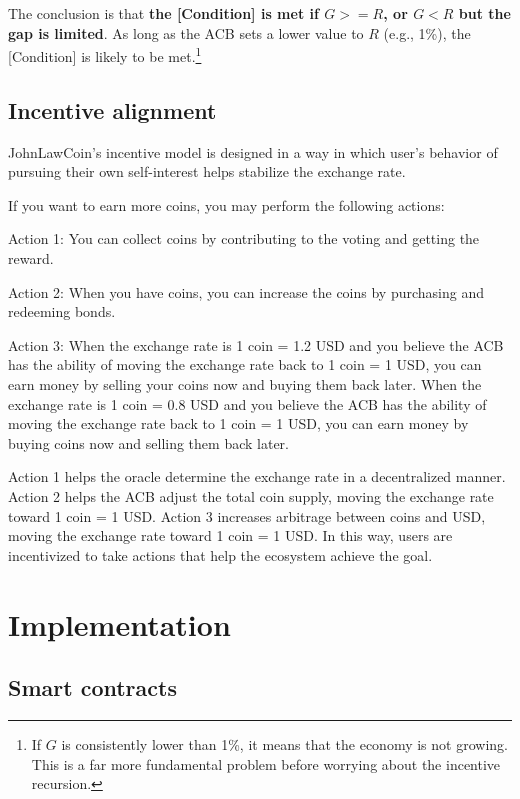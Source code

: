 \documentclass[dvipdfmx,a4paper]{article}
\begin{document}
The conclusion is that \textbf{the [Condition] is met if $G>=R$, or $G<R$ but the gap is limited}. As long as the ACB sets a lower value to $R$ (e.g., 1\%), the [Condition] is likely to be met.\footnote{If $G$ is consistently lower than 1\%, it means that the economy is not growing. This is a far more fundamental problem before worrying about the incentive recursion.}

\subsection{Incentive alignment}

JohnLawCoin's incentive model is designed in a way in which user's behavior of pursuing their own self-interest helps stabilize the exchange rate.

If you want to earn more coins, you may perform the following actions:

\begin{description}
\item{Action 1}: You can collect coins by contributing to the voting and getting the reward.
\item{Action 2}: When you have coins, you can increase the coins by purchasing and redeeming bonds.
\item{Action 3}: When the exchange rate is 1 coin = 1.2 USD and you believe the ACB has the ability of moving the exchange rate back to 1 coin = 1 USD, you can earn money by selling your coins now and buying them back later. When the exchange rate is 1 coin = 0.8 USD and you believe the ACB has the ability of moving the exchange rate back to 1 coin = 1 USD, you can earn money by buying coins now and selling them back later.
\end{description}

Action 1 helps the oracle determine the exchange rate in a decentralized manner. Action 2 helps the ACB adjust the total coin supply, moving the exchange rate toward 1 coin = 1 USD. Action 3 increases arbitrage between coins and USD, moving the exchange rate toward 1 coin = 1 USD. In this way, users are incentivized to take actions that help the ecosystem achieve the goal.

\section{Implementation}

\subsection{Smart contracts}
\end{document}
